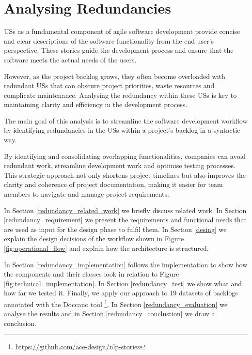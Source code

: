 \section{Analysing Redundancies}\label{redundancy}
USs as a fundamental component of agile software development provide concise and clear descriptions of the software functionality from the end user's perspective. These stories guide the development process and ensure that the software meets the actual needs of the users. 

However, as the project backlog grows, they often become overloaded with redundant USs that can obscure project priorities, waste resources and complicate maintenance. Analysing the redundancy within these USs is key to maintaining clarity and efficiency in the development process.

The main goal of this analysis is to streamline the software development workflow by identifying redundancies in the USs within a project's backlog in a syntactic way.

 By identifying and consolidating overlapping functionalities, companies can avoid redundant work, streamline development work and optimise testing processes. This strategic approach not only shortens project timelines but also improves the clarity and coherence of project documentation, making it easier for team members to navigate and manage project requirements.

In Section \ref{redundancy_related_work} we briefly discuss related work. In Section \ref{redundancy_requirement} we present the requirements and functional needs that are used as input for the design phase to fulfil them. In Section \ref{desing} we explain the design decisions of the workflow shown in Figure \ref{fig:operational_flow} and explain how the architecture is structured. 

In Section \ref{redundancy_implementation} follows the implementation to show how the components and their classes look in relation to Figure \ref{fig:technical_implementation}. In Section \ref{redundancy_test} we show what and how far we tested it. Finally, we apply our approach to 19 datasets of backlogs annotated with the Doccano tool \footnote {\href{https://github.com/ace-design/nlp-stories}{https://github.com/ace-design/nlp-stories} }. In Section \ref{redundancy_evaluation} we analyse the results and in Section \ref{redundancy_conclustion} we draw a conclusion. 
